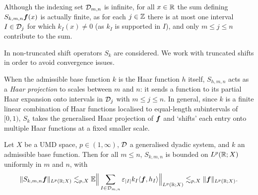 Although the indexing set $\mathcal{D}_{m,n}$ is infinite, for all $x \in \mathbb{R}$ the sum defining $S_{k,m,n}\bm{f}(x)$ is actually finite, as for each $j \in \mathbb{Z}$ there is at most one interval $I \in \mathcal{D}_{j}$ for which $k_{I}(x) \neq 0$ (as $k_{I}$ is supported in $I$), and only $m \leq j \leq n$ contribute to the sum.

\begin{rmk}
  In \cite{HNVW16} non-truncated shift operators $S_{k}$ are considered.
  We work with truncated shifts in order to avoid convergence issues.
\end{rmk}

When the admissible base function $k$ is the Haar function $h$ itself, $S_{h, m,n}$ acts as a \emph{Haar projection} to scales between $m$ and $n$: it sends a function to its partial Haar expansion onto intervals in $\mathcal{D}_{j}$ with $m \leq j \leq n$.
In general, since $k$ is a finite linear combination of Haar functions localised to equal-length subintervals of $[0,1)$, $S_{k}$ takes the generalised Haar projection of $\bm{f}$ and `shifts' each entry onto multiple Haar functions at a fixed smaller scale.

\begin{thm}\label{eq:shift-boundedness}
  Let $X$ be a UMD space, $p \in (1,\infty)$, $\mathcal{D}$ a generalised dyadic system, and $k$ an admissible base function.
  Then for all $m \leq n$, $S_{k,m,n}$ is bounded on $L^{p}(\mathbb{R};X)$ uniformly in $m$ and $n$,
  with
  \begin{equation*}
    \|S_{k,m,n} \bm{f}\|_{L^p(\mathbb{R};X)} \lesssim_{p,X} \mathbb{E} \Big\| \sum_{I \in \mathcal{D}_{m,n}} \varepsilon_{|I|} k_{I} \langle \bm{f}, h_{I} \rangle \Big\|_{L^p(\mathbb{R};X)} \lesssim_{p,X} \|\bm{f}\|_{L^p(\mathbb{R};X)}.
  \end{equation*}
\end{thm}

